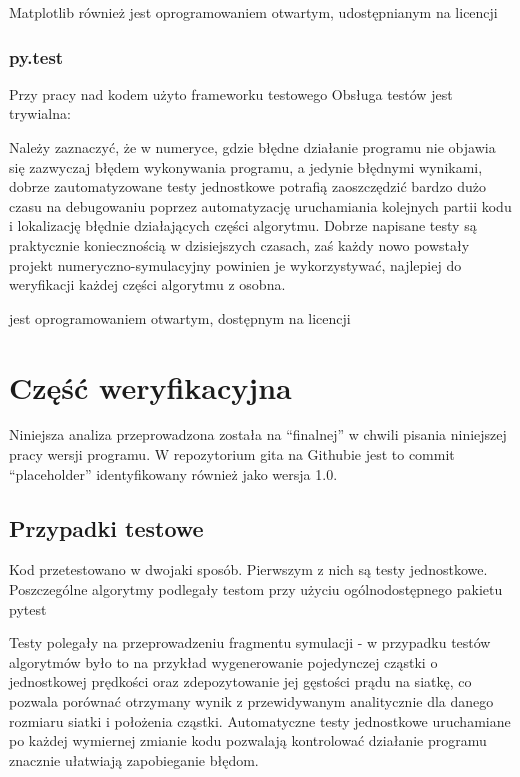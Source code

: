     Matplotlib również jest oprogramowaniem otwartym, udostępnianym na licencji

    \subsubsection{py.test}
    Przy pracy nad kodem użyto frameworku testowego  %
    Obsługa testów jest trywialna:


    Należy zaznaczyć, że w numeryce, gdzie błędne działanie programu nie objawia się
    zazwyczaj błędem wykonywania programu, a jedynie błędnymi wynikami, dobrze zautomatyzowane
    testy jednostkowe potrafią zaoszczędzić bardzo dużo czasu na debugowaniu
    poprzez automatyzację uruchamiania kolejnych partii kodu i lokalizację błędnie działających
    części algorytmu. Dobrze napisane testy są praktycznie koniecznością w dzisiejszych
    czasach, zaś każdy nowo powstały projekt numeryczno-symulacyjny powinien je
    wykorzystywać, najlepiej do weryfikacji każdej części algorytmu z osobna.

     jest oprogramowaniem otwartym, dostępnym na licencji %


    \section[Weryfikacja]{Część weryfikacyjna} %
    Niniejsza analiza przeprowadzona została na ``finalnej'' w chwili pisania niniejszej pracy wersji programu.
    W repozytorium gita na Githubie jest to commit ``placeholder'' %
    identyfikowany również jako wersja 1.0.

    \subsection{Przypadki testowe}

    Kod przetestowano w dwojaki sposób. Pierwszym z nich są testy jednostkowe.
    Poszczególne algorytmy podlegały testom przy użyciu ogólnodostępnego pakietu pytest %

    Testy polegały na przeprowadzeniu fragmentu symulacji - w przypadku testów algorytmów było to na przykład wygenerowanie
    pojedynczej cząstki o jednostkowej prędkości oraz zdepozytowanie jej gęstości prądu na siatkę, co pozwala porównać
    otrzymany wynik z przewidywanym analitycznie dla danego rozmiaru siatki i położenia cząstki. Automatyczne testy
    jednostkowe uruchamiane po każdej wymiernej zmianie kodu pozwalają kontrolować działanie programu znacznie ułatwiają
    zapobieganie błędom.


